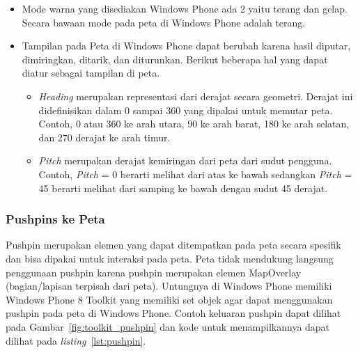 \begin{itemize}
	\item	Mode warna yang disediakan Windows Phone ada 2 yaitu terang dan gelap. Secara bawaan mode pada peta di Windows Phone adalah terang.
	
	\item Tampilan pada Peta di Windows Phone dapat berubah karena hasil diputar, dimiringkan, ditarik, dan diturunkan. Berikut beberapa hal yang dapat diatur sebagai tampilan di peta.
	
		\begin{itemize}
			\item \textit{Heading} merupakan representasi dari derajat secara geometri. Derajat ini didefinisikan dalam 0 sampai 360 yang dipakai untuk memutar peta. Contoh, 0 atau 360 ke arah utara, 90 ke arah barat, 180 ke arah selatan, dan 270 derajat ke arah timur.
			\item \textit{Pitch} merupakan derajat kemiringan dari peta dari sudut pengguna. Contoh, \textit{Pitch} = 0 berarti melihat dari atas ke bawah sedangkan \textit{Pitch} = 45 berarti melihat dari samping ke bawah dengan sudut 45 derajat.
		\end{itemize} 
\end{itemize}

\subsubsection{Pushpins ke Peta}
\label{subsubsec:Pushpins ke Peta}
\hspace{0.5cm} Pushpin merupakan elemen yang dapat ditempatkan pada peta secara spesifik dan bisa dipakai untuk interaksi pada peta. Peta tidak mendukung langsung penggunaan pushpin karena pushpin merupakan elemen MapOverlay (bagian/lapisan terpisah dari peta). Untungnya di Windows Phone memiliki Windows Phone 8 Toolkit yang memiliki set objek agar dapat menggunakan pushpin pada peta di Windows Phone. Contoh keluaran pushpin dapat dilihat pada Gambar~\ref{fig:toolkit_pushpin} dan kode untuk menampilkannya dapat dilihat pada \textit{listing}~\ref{lst:pushpin}.

